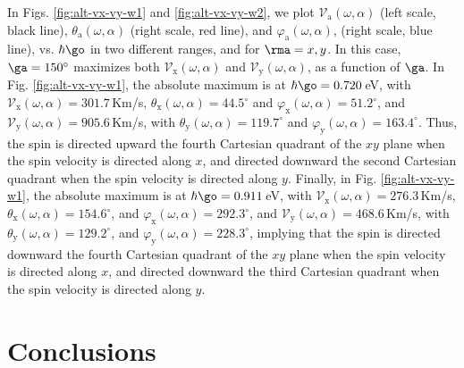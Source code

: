 \documentclass[floatfix,prb,aps,superscriptaddress,showpacs,11pt,preprint,letterpaper]{revtex4}
\begin{document}
In Figs. \ref{fig:alt-vx-vy-w1} and \ref{fig:alt-vx-vy-w2}, we plot
$\mathcal{V}_{\mathrm{a}} (\omega,\alpha)$ (left scale, black line),
$\theta_{\mathrm{a}} (\omega,\alpha)$ (right scale, red line), and
$\varphi_{\mathrm{a}} (\omega,\alpha)$, (right scale, blue line), vs.
$\hbar\go$ in two different ranges, and  for $\rma=x,y$. In this case,
$\ga=150^\circ$  maximizes both $\mathcal{V}_{\mathrm{x}} (\omega,\alpha)$
and $\mathcal{V}_{\mathrm{y}} (\omega,\alpha)$, as a function of $\ga$.
% 
In Fig. \ref{fig:alt-vx-vy-w1}, the absolute maximum is at
$\hbar\go=0.720$\,eV, with $\mathcal{V}_{\mathrm{x}}
(\omega,\alpha) = 301.7$\,Km/s, $\theta_{\mathrm{x}} (\omega,\alpha) =
44.5^{\circ}$ and $\varphi_{\mathrm{x}}(\omega,\alpha) = 51.2^{\circ}$,
and $\mathcal{V}_{\mathrm{y}} (\omega,\alpha) = 905.6$\,Km/s, with
$\theta_{\mathrm{y}} (\omega,\alpha) = 119.7^{\circ}$ and
$\varphi_{\mathrm{y}}(\omega,\alpha) = 163.4^{\circ}$. 
% 
Thus, the spin is directed upward the fourth Cartesian quadrant of the $xy$
plane when the spin velocity is directed along $x$, and directed downward the
second Cartesian quadrant when the spin velocity is directed along $y$.
% 
Finally, in  Fig. \ref{fig:alt-vx-vy-w1}, the absolute maximum is at
$\hbar\go=0.911$\,eV, with $\mathcal{V}_{\mathrm{x}} (\omega,\alpha) =
276.3$\,Km/s, $\theta_{\mathrm{x}} (\omega,\alpha) = 154.6^{\circ}$, and
$\varphi_{\mathrm{x}}(\omega,\alpha) = 292.3^{\circ}$, and
$\mathcal{V}_{\mathrm{y}} (\omega,\alpha) = 468.6$\,Km/s, with
$\theta_{\mathrm{y}} (\omega,\alpha) = 129.2^{\circ}$, and
$\varphi_{\mathrm{y}}(\omega,\alpha) = 228.3^{\circ}$, implying that the spin
is directed downward the fourth Cartesian quadrant of the $xy$ plane when the
spin velocity is directed along $x$, and directed downward the third Cartesian
quadrant when the spin velocity is directed along $y$.

\section{Conclusions} %
\label{sec:conclusions}
\end{document}
